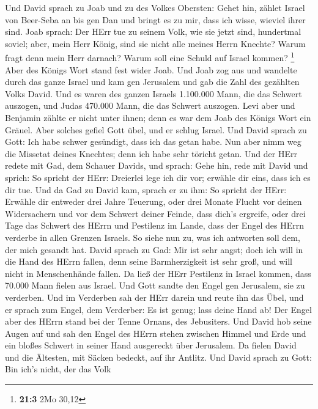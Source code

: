  Und David sprach zu Joab und zu des Volkes Obersten: Gehet
hin, zählet Israel von Beer-Seba an bis gen Dan und bringt es zu mir,
dass ich wisse, wieviel ihrer sind.  Joab sprach: Der HErr
tue zu seinem Volk, wie sie jetzt sind, hundertmal soviel; aber, mein
Herr König, sind sie nicht alle meines Herrn Knechte? Warum fragt denn
mein Herr darnach? Warum soll eine Schuld auf Israel kommen? \footnote{\textbf{21:3}
  2Mo 30,12}  Aber des Königs Wort stand fest wider Joab.
Und Joab zog aus und wandelte durch das ganze Israel und kam gen
Jerusalem  und gab die Zahl des gezählten Volks David. Und
es waren des ganzen Israels 1.100.000 Mann, die das Schwert auszogen,
und Judas 470.000 Mann, die das Schwert auszogen.  Levi aber
und Benjamin zählte er nicht unter ihnen; denn es war dem Joab des
Königs Wort ein Gräuel.  Aber solches gefiel Gott übel, und
er schlug Israel.  Und David sprach zu Gott: Ich habe schwer
gesündigt, dass ich das getan habe. Nun aber nimm weg die Missetat
deines Knechtes; denn ich habe sehr töricht getan.  Und der
HErr redete mit Gad, dem Schauer Davids, und sprach:  Gehe
hin, rede mit David und sprich: So spricht der HErr: Dreierlei lege ich
dir vor; erwähle dir eins, dass ich es dir tue.  Und da Gad
zu David kam, sprach er zu ihm: So spricht der HErr: Erwähle dir
 entweder drei Jahre Teuerung, oder drei Monate Flucht vor
deinen Widersachern und vor dem Schwert deiner Feinde, dass dich's
ergreife, oder drei Tage das Schwert des HErrn und Pestilenz im Lande,
dass der Engel des HErrn verderbe in allen Grenzen Israels. So siehe nun
zu, was ich antworten soll dem, der mich gesandt hat. 
David sprach zu Gad: Mir ist sehr angst; doch ich will in die Hand des
HErrn fallen, denn seine Barmherzigkeit ist sehr groß, und will nicht in
Menschenhände fallen.  Da ließ der HErr Pestilenz in Israel
kommen, dass 70.000 Mann fielen aus Israel.  Und Gott
sandte den Engel gen Jerusalem, sie zu verderben. Und im Verderben sah
der HErr darein und reute ihn das Übel, und er sprach zum Engel, dem
Verderber: Es ist genug; lass deine Hand ab! Der Engel aber des HErrn
stand bei der Tenne Ornans, des Jebusiters.  Und David hob
seine Augen auf und sah den Engel des HErrn stehen zwischen Himmel und
Erde und ein bloßes Schwert in seiner Hand ausgereckt über Jerusalem. Da
fielen David und die Ältesten, mit Säcken bedeckt, auf ihr Antlitz.
 Und David sprach zu Gott: Bin ich's nicht, der das Volk
